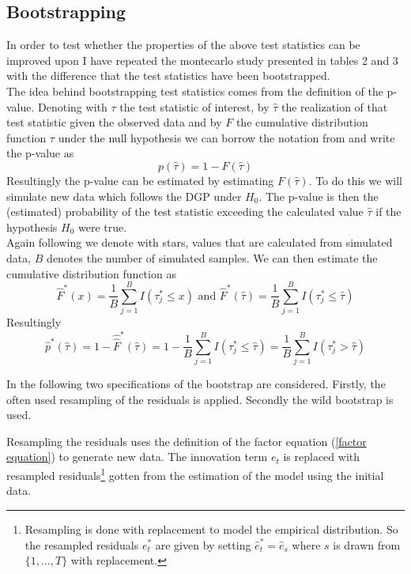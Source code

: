 \documentclass[12pt]{article}
\begin{document}
\subsection{Bootstrapping \citet{breitung2011testing}}
In order to test whether the properties of the above test statistics can be improved upon I have repeated the montecarlo study presented in \citet{breitung2011testing} tables 2 and 3 with the difference that the test statistics have been bootstrapped. \\

The idea behind bootstrapping test statistics comes from the definition of the p-value. Denoting with $\tau$ the test statistic of interest, by $\hat \tau$ the realization of that test statistic given the observed data and by $F$ the cumulative distribution function $\tau$ under the null hypothesis we can borrow the notation from \citet{davidson2004econometric} and write the p-value as
$$p(\hat \tau) = 1 - F(\hat \tau)$$
Resultingly the p-value can be estimated by estimating $F(\hat \tau)$. To do this we will simulate new data which follows the DGP under $H_0$. The p-value is then the (estimated) probability of the test statistic exceeding the calculated value $\hat \tau$ if the hypothesis $H_0$ were true. \\

Again following \citet{davidson2004econometric} we denote with stars, values that are calculated from simulated data, $B$ denotes the number of simulated samples. We can then estimate the cumulative distribution function as 
$$\hat F^*(x) = \frac{1}{B} \sum_{j=1}^B I(\tau^*_j \leq x) \text{ and } \hat F^*(\hat \tau) = \frac{1}{B} \sum_{j=1}^B I(\tau^*_j \leq \hat \tau)$$
Resultingly
$$\hat p^*(\hat \tau) = 1 - \hat \hat F^*(\hat \tau) = 1 - \frac{1}{B} \sum_{j=1}^B I (\tau^*_j \leq \hat \tau) = \frac{1}{B}\sum_{j=1}^B I(\tau^*_j > \hat \tau)$$

In the following two specifications of the bootstrap are considered. Firstly, the often used resampling of the residuals is applied. Secondly the wild bootstrap is used. 

Resampling the residuals uses the definition of the factor equation (\ref{factor equation}) to generate new data. The innovation term $e_t$ is replaced with resampled residuals\footnote{Resampling is done with replacement to model the empirical distribution. So the resampled residuals $e_t^*$ are given by setting $\hat e_t^* = \hat e_s$ where $s$ is drawn from $\{1, ..., T\}$ with replacement.} gotten from the estimation of the model using the initial data.
\end{document}
